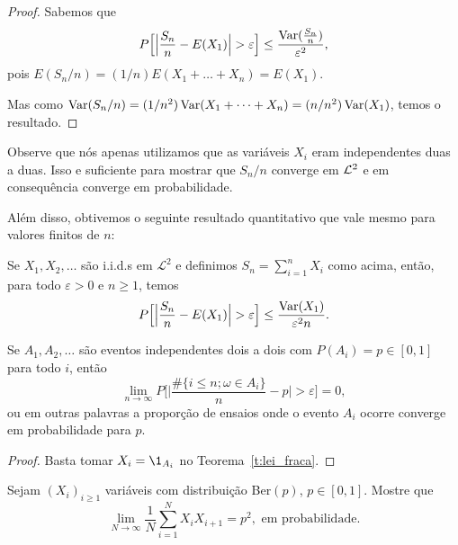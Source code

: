 \begin{proof}
  Sabemos que
  \begin{equation}
    P \Big[\Big| \frac{S_n}{n} - E(X_1)\Big| > \varepsilon \Big] \leq \frac{\operatorname{Var}(\tfrac{S_n}{n})}{\varepsilon^2},
  \end{equation}
  pois $E(S_n/n) = (1/n) E(X_1 + \dots + X_n) = E(X_1)$.

  Mas como $\operatorname{Var}(S_n/n) = (1/n^2) \operatorname{Var} (X_1 + \dots + X_n) = (n/n^2) \operatorname{Var}(X_1)$, temos o resultado.
\end{proof}

\begin{remark}
 Observe que nós apenas utilizamos que as variáveis $X_i$ eram independentes duas a duas.
 Isso e suficiente para mostrar que $S_n/n$ converge em ${\mathcal L}^2$ e em consequência converge em probabilidade.
\end{remark}



Além disso, obtivemos o seguinte resultado quantitativo que vale mesmo para valores finitos de $n$:

\begin{scholia}
  Se $X_1, X_2, \dots$ são i.i.d.s em $\mathcal{L}^2$ e definimos $S_n = \sum_{i=1}^n X_i$ como acima, então, para todo $\varepsilon > 0$ e $n \geq 1$, temos
  \begin{equation}
    P \Big[\Big| \frac{S_n}{n} - E(X_1)\Big| > \varepsilon \Big] \leq \frac{\operatorname{Var}(X_1)}{\varepsilon^2 n}.
  \end{equation}
\end{scholia}





\begin{corollary}
  Se $A_1, A_2, \dots$ são eventos independentes dois a dois com $P(A_i) = p \in [0,1]$ para todo $i$, então
  \begin{equation}
    \lim_{n \to \infty} P \Big[ \Big| \frac{\#\{i \leq n; \omega \in A_i\}}{n} - p \Big| > \varepsilon \Big] = 0,
  \end{equation}
  ou em outras palavras a proporção de ensaios onde o evento $A_i$ ocorre converge em probabilidade para $p$.
\end{corollary}

\begin{proof}
  Basta tomar $X_i = \1_{A_i}$ no Teorema~\ref{t:lei_fraca}.
\end{proof}

\begin{exercise}
  Sejam $(X_i)_{i \geq 1}$ variáveis \iid com distribui\c{c}\~ao Ber$(p)$, $p \in [0,1]$. Mostre que
  \begin{equation}
    \lim_{N \to \infty} \frac 1N \sum_{i = 1}^N X_i X_{i+1} = p^2, \text{ em probabilidade.}
  \end{equation}
\end{exercise}

